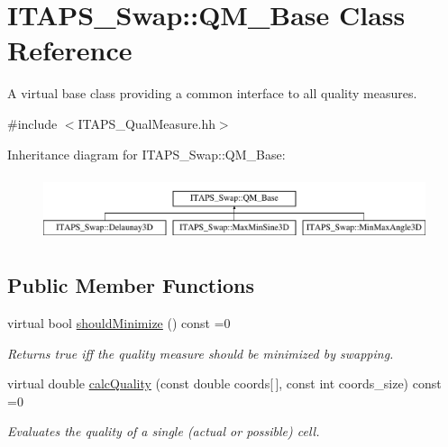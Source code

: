 \hypertarget{class_i_t_a_p_s___swap_1_1_q_m___base}{
\section{ITAPS\_\-Swap::QM\_\-Base Class Reference}
\label{class_i_t_a_p_s___swap_1_1_q_m___base}
}


A virtual base class providing a common interface to all quality measures.  




{\ttfamily \#include $<$ITAPS\_\-QualMeasure.hh$>$}

Inheritance diagram for ITAPS\_\-Swap::QM\_\-Base:\begin{figure}[H]
\begin{center}
\leavevmode
\includegraphics[height=1.93437cm]{class_i_t_a_p_s___swap_1_1_q_m___base}
\end{center}
\end{figure}
\subsection*{Public Member Functions}
\begin{DoxyCompactItemize}
\item 
\hypertarget{class_i_t_a_p_s___swap_1_1_q_m___base_a9d7415385a5f0a03eb00553864a48789}{
virtual bool \hyperlink{class_i_t_a_p_s___swap_1_1_q_m___base_a9d7415385a5f0a03eb00553864a48789}{shouldMinimize} () const =0}
\label{class_i_t_a_p_s___swap_1_1_q_m___base_a9d7415385a5f0a03eb00553864a48789}

\begin{DoxyCompactList}\small\item\em Returns true iff the quality measure should be minimized by swapping. \item\end{DoxyCompactList}\item 
virtual double \hyperlink{class_i_t_a_p_s___swap_1_1_q_m___base_aea047b3afc06b75a1115bbaddd8286ee}{calcQuality} (const double coords\mbox{[}$\,$\mbox{]}, const int coords\_\-size) const =0
\begin{DoxyCompactList}\small\item\em Evaluates the quality of a single (actual or possible) cell. \item\end{DoxyCompactList}\end{DoxyCompactItemize}


